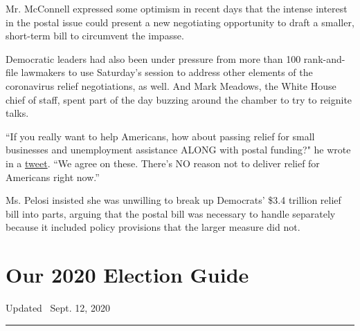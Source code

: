 Mr. McConnell expressed some optimism in recent days that the intense
interest in the postal issue could present a new negotiating opportunity
to draft a smaller, short-term bill to circumvent the impasse.

Democratic leaders had also been under pressure from more than 100
rank-and-file lawmakers to use Saturday's session to address other
elements of the coronavirus relief negotiations, as well. And Mark
Meadows, the White House chief of staff, spent part of the day buzzing
around the chamber to try to reignite talks.

``If you really want to help Americans, how about passing relief for
small businesses and unemployment assistance ALONG with postal funding?"
he wrote in a
\href{https://twitter.com/MarkMeadows/status/1297196107982942209}{tweet}.
``We agree on these. There's NO reason not to deliver relief for
Americans right now.''

Ms. Pelosi insisted she was unwilling to break up Democrats' \$3.4
trillion relief bill into parts, arguing that the postal bill was
necessary to handle separately because it included policy provisions
that the larger measure did not.

\hypertarget{our-2020-election-guide}{%
\section{Our 2020 Election Guide}\label{our-2020-election-guide}}

Updated ~Sept. 12, 2020

\begin{center}\rule{0.5\linewidth}{\linethickness}\end{center}

